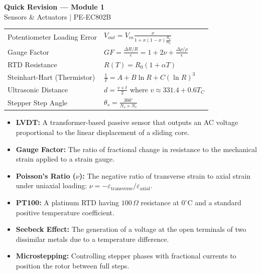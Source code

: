 \documentclass[12pt,a4paper]{article}
\renewcommand{\arraystretch}{1.45}
\begin{document}
\newpage

\begin{center}
  {\large\bfseries\color{myred} Quick Revision --- Module 1}\\[3pt]
  {\small\color{mydark} Sensors \& Actuators $|$ PE-EC802B}
\end{center}
\noindent{\color{myred}\rule{\linewidth}{1.2pt}}
\vspace{4pt}

\begin{tcolorbox}[formulabox, title={\textbf{Key Formulas at a Glance}}]
\renewcommand{\arraystretch}{1.35}
\begin{tabularx}{\linewidth}{B{5.2cm} X}
Potentiometer Loading Error & $V_{out} = V_{in} \frac{x}{1 + x(1-x)\frac{R_p}{R_L}}$ \\[4pt]
Gauge Factor & $GF = \frac{\Delta R / R}{\epsilon} = 1 + 2\nu + \frac{\Delta\rho/\rho}{\epsilon}$ \\[4pt]
RTD Resistance & $R(T) = R_0 (1 + \alpha T)$ \\[4pt]
Steinhart-Hart (Thermistor) & $\frac{1}{T} = A + B \ln R + C (\ln R)^3$ \\[4pt]
Ultrasonic Distance & $d = \frac{v \times t}{2}$ where $v \approx 331.4 + 0.6 T_C$ \\[4pt]
Stepper Step Angle & $\theta_s = \frac{360^\circ}{N_s \times N_r}$ \\
\end{tabularx}
\end{tcolorbox}

\begin{tcolorbox}[defbox, title={\textbf{One-Line Definitions}}]
\begin{itemize}[leftmargin=*, itemsep=2pt, topsep=0pt]
  \item \textbf{LVDT:} A transformer-based passive sensor that outputs an AC voltage proportional to the linear displacement of a sliding core.
  \item \textbf{Gauge Factor:} The ratio of fractional change in resistance to the mechanical strain applied to a strain gauge.
  \item \textbf{Poisson's Ratio ($\nu$):} The negative ratio of transverse strain to axial strain under uniaxial loading: $\nu=-\varepsilon_{\mathrm{transverse}}/\varepsilon_{\mathrm{axial}}$.
  \item \textbf{PT100:} A platinum RTD having $100\,\Omega$ resistance at $0^\circ$C and a standard positive temperature coefficient.
  \item \textbf{Seebeck Effect:} The generation of a voltage at the open terminals of two dissimilar metals due to a temperature difference.
  \item \textbf{Microstepping:} Controlling stepper phases with fractional currents to position the rotor between full steps.
\end{itemize}
\end{tcolorbox}
\end{document}
